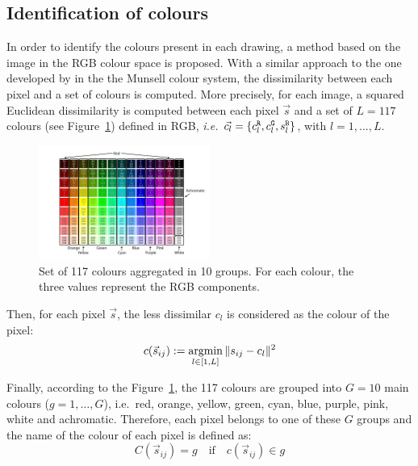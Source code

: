 \documentclass[11pt,a4paper]{article}
\begin{document}
\subsection{Identification of colours}
\label{sec:identification}




In order to identify the colours present in each drawing, a method based on the image in the RGB colour space is
proposed. With a similar approach to the one developed by
\cite{kimbaelee2007} in the the Munsell colour system, the dissimilarity
between each pixel and a set of colours is computed. More precisely, for
each image, a squared Euclidean dissimilarity is computed between each
pixel \(\vec{s}\) and a set of $L = 117$ colours (see Figure~\ref{fig:colour_set}) defined in RGB, \textit{i.e.}
\(\vec{c_l} = \{ c^{\tt \scriptstyle R}_{l}, c^{\tt \scriptstyle G}_{l}, s^{\tt \scriptstyle B}_{l} \}\),
with $l = 1, ..., L$.

\begin{figure}
	\centering
	\includegraphics[width=0.5\textwidth]{figures/Col_tab.pdf}
	\caption{Set of 117 colours aggregated in 10 groups. For each colour, the three values represent the RGB components. \label{fig:colour_set}}
\end{figure}

Then, for each pixel \(\vec{s}\), the less dissimilar \(c_l\) is considered as
the colour of the pixel:
\begin{equation*}
c(\vec{s}_{ij}) := \operatornamewithlimits{argmin}_{l \in [1,L]} \| s_{ij} - c_{l} \|^{2}
\end{equation*}



Finally, according to the Figure~\ref{fig:colour_set}, the 117 colours are grouped into $G = 10$
main colours ($g = 1, \dots, G$), i.e.~red, orange, yellow, green, cyan, blue, purple, pink,
white and achromatic. Therefore, each pixel belongs to one of these
$G$ groups and the name of the colour of each pixel is defined as: 
{\color{red}
	\begin{equation*}
	C(\vec{s}_{ij}) = g \quad \textrm{if} \quad c(\vec{s}_{ij}) \in g
	\end{equation*}
}
\end{document}
